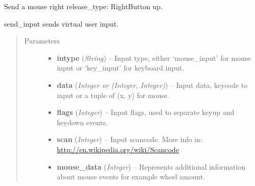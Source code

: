 \documentclass[letterpaper,10pt,english]{sphinxmanual}
\begin{document}

\begin{fulllineitems}
\label{macro:macro.right_release}
Send a mouse right release\_type: RightButton up.

\end{fulllineitems}


\begin{fulllineitems}
\label{macro:macro.send_input}
send\_input sends virtual user input.
\begin{quote}\begin{description}
\item[{Parameters}] \leavevmode\begin{itemize}
\item {} 
\textbf{intype} (\emph{String}) -- Input type, either `mouse\_input' for mouse input or `key\_input' for
keyboard input.

\item {} 
\textbf{data} (\emph{Integer or (Integer, Integer)}) -- Input data, keycode to input or a tuple of (x, y) for mouse.

\item {} 
\textbf{flags} (\emph{Integer}) -- Input flags, used to separate keyup and keydown events.

\item {} 
\textbf{scan} (\emph{Integer}) -- Input scancode. More info in: \href{http://en.wikipedia.org/wiki/Scancode}{http://en.wikipedia.org/wiki/Scancode}

\item {} 
\textbf{mouse\_data} (\emph{Integer}) -- Represents additional information about mouse events for example wheel
amount.

\end{itemize}

\end{description}\end{quote}

\end{fulllineitems}

\end{document}
